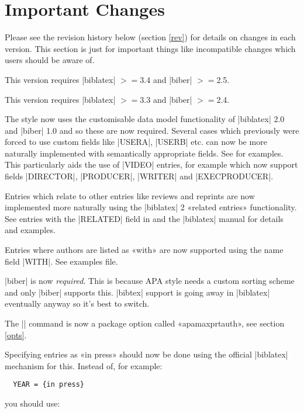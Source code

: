 \documentclass{ltxdockit}
\begin{document}
\printtitlepage
\tableofcontents

\section{Important Changes}\label{special}

Please see the revision history below (section \ref{rev}) for  details on changes in each
version. This section is just for important things like incompatible
changes which users should be aware of.

This version requires |biblatex| $>=$3.4 and |biber| $>=$2.5.

This version requires |biblatex| $>=$3.3 and |biber| $>=$2.4.

The style now uses the customisable data model functionality of |biblatex|
2.0 and |biber| 1.0 and so these are now required. Several cases
which previously were forced to use custom fields like |USERA|,
|USERB| etc. can now be more naturally implemented with semantically
appropriate fields. See  for
examples. This particularly aids the use of |VIDEO| entries, for
example which now support fields |DIRECTOR|, |PRODUCER|,
|WRITER| and |EXECPRODUCER|.

Entries which relate to other entries like reviews and reprints are
now implemented more naturally using the |biblatex| 2 «related
entries» functionality. See entries with the |RELATED| field in
 and the |biblatex| manual for
details and examples.

Entries where authors are listed as «with» are now supported using the
name field |WITH|. See examples file.

|biber| is now \emph{required}. This is because APA style needs a custom
sorting scheme and only |biber| supports this. |bibtex| support is going
away in |biblatex| eventually anyway so it's best to switch.

The |\maxprtauth| command is now a package option called
«apamaxprtauth», see section \ref{opts}.

Specifying entries as «in press» should now be done using the official |biblatex|
mechanism for this. Instead of, for example:

\begin{verbatim}
  YEAR = {in press}
\end{verbatim}

\noindent you should use:
\end{document}
